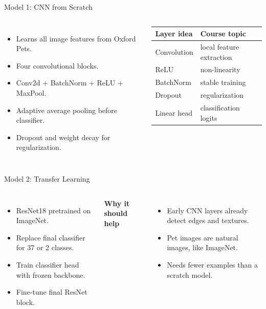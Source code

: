 \documentclass[aspectratio=169]{beamer}
\begin{document}
\begin{frame}{Model 1: CNN from Scratch}
\begin{columns}
\begin{itemize}
    \item Learns all image features from Oxford Pets.
    \item Four convolutional blocks.
    \item Conv2d + BatchNorm + ReLU + MaxPool.
    \item Adaptive average pooling before classifier.
    \item Dropout and weight decay for regularization.
\end{itemize}
\begin{center}
\begin{tabular}{ll}
\toprule
Layer idea & Course topic \\
\midrule
Convolution & local feature extraction \\
ReLU & non-linearity \\
BatchNorm & stable training \\
Dropout & regularization \\
Linear head & classification logits \\
\bottomrule
\end{tabular}
\end{center}
\end{columns}
\end{frame}

\begin{frame}{Model 2: Transfer Learning}
\begin{columns}
\begin{itemize}
    \item ResNet18 pretrained on ImageNet.
    \item Replace final classifier for 37 or 2 classes.
    \item Train classifier head with frozen backbone.
    \item Fine-tune final ResNet block.
\end{itemize}
\textbf{Why it should help}
\begin{itemize}
    \item Early CNN layers already detect edges and textures.
    \item Pet images are natural images, like ImageNet.
    \item Needs fewer examples than a scratch model.
\end{itemize}
\end{columns}
\end{frame}
\end{document}
